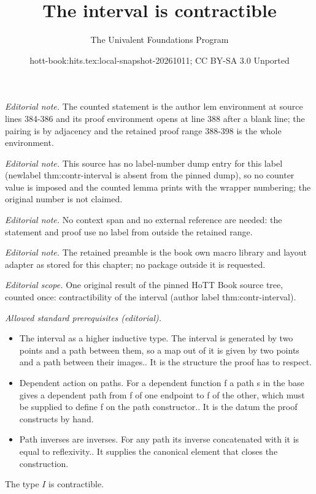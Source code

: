\documentclass[10pt,a4paper]{article}
\title{The interval is contractible}
\author{The Univalent Foundations Program}
\date{hott-book:hits.tex:local-snapshot-20261011; CC BY-SA 3.0 Unported}
\newcounter{chapter}
\newcommand{\interval}{\ensuremath{I}\xspace}
\theoremstyle{definition}
\theoremstyle{remark}
\numberwithin{equation}{section}
\begin{document}
\maketitle
\noindent\textit{Editorial note.} The counted statement is the author lem environment at source lines 384-386 and its proof environment opens at line 388 after a blank line; the pairing is by adjacency and the retained proof range 388-398 is the whole environment.\par\medskip
\noindent\textit{Editorial note.} This source has no label-number dump entry for this label (newlabel thm:contr-interval is absent from the pinned dump), so no counter value is imposed and the counted lemma prints with the wrapper numbering; the original number is not claimed.\par\medskip
\noindent\textit{Editorial note.} No context span and no external reference are needed: the statement and proof use no label from outside the retained range.\par\medskip
\noindent\textit{Editorial note.} The retained preamble is the book own macro library and layout adapter as stored for this chapter; no package outside it is requested.\par\medskip
\noindent\textit{Editorial scope.} One original result of the pinned HoTT Book source tree, counted once: contractibility of the interval (author label thm:contr-interval).\par\medskip
\noindent\textit{Allowed standard prerequisites (editorial).}\begin{itemize}
\item The interval as a higher inductive type. The interval is generated by two points and a path between them, so a map out of it is given by two points and a path between their images.. It is the structure the proof has to respect.
\item Dependent action on paths. For a dependent function f a path s in the base gives a dependent path from f of one endpoint to f of the other, which must be supplied to define f on the path constructor.. It is the datum the proof constructs by hand.
\item Path inverses are inverses. For any path its inverse concatenated with it is equal to reflexivity.. It supplies the canonical element that closes the construction.
\end{itemize}\medskip
\begin{lem}\label{thm:contr-interval}
  The type $\interval$ is contractible.
\end{lem}
\end{document}
